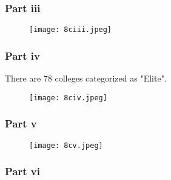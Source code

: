 \documentclass[11pt]{article}
\begin{document}
\subsubsection*{Part iii}

\begin{figure}[H]
	\centering
	\texttt{[image: 8ciii.jpeg]}
\end{figure}

\subsubsection*{Part iv}

There are 78 colleges categorized as "Elite".

\begin{figure}[H]
	\centering
	\texttt{[image: 8civ.jpeg]}
\end{figure}

\subsubsection*{Part v}

\begin{figure}[H]
	\centering
	\texttt{[image: 8cv.jpeg]}
\end{figure}

\subsubsection*{Part vi}



\listoftodos
\end{document}
